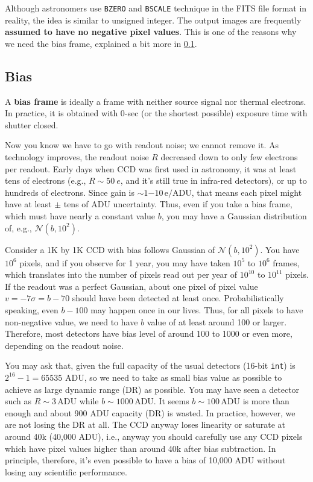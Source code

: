 Although astronomers use \texttt{BZERO} and \texttt{BSCALE} technique in the FITS file format in reality, the idea is similar to unsigned integer. The output images are frequently \textbf{assumed to have no negative pixel values}. This is one of the reasons why we need the bias frame, explained a bit more in \cref{ss: calib-bias}.



\subsection{Bias} \label{ss: calib-bias} 
\begin{defn}[Bias]
A \textbf{bias frame} is ideally a frame with neither source signal nor thermal electrons. In practice, it is obtained with 0-sec (or the shortest possible) exposure time with shutter closed.
\end{defn}

Now you know we have to go with readout noise; we cannot remove it. As technology improves, the readout noise $ R $ decreased down to only few electrons per readout. Early days when CCD was first used in astronomy, it was at least tens of electrons (e.g., $ R \sim \SI{50}{e} $, and it's still true in infra-red detectors), or up to hundreds of electrons. Since gain is $ \sim 1\mathrm{-}10 \,\mathrm{e/ADU} $, that means each pixel might have at least $ \pm $ tens of ADU uncertainty. Thus, even if you take a bias frame, which must have nearly a constant value $ b $, you may have a Gaussian distribution of, e.g., $ \mathcal{N}(b, 10^2) $. 

Consider a 1K by 1K CCD with bias follows Gaussian of $ \mathcal{N}(b, 10^2) $. You have $ 10^6 $ pixels, and if you observe for 1 year, you may have taken $ 10^5 $ to $ 10^6 $ frames, which translates into the number of pixels read out per year of $ 10^{10} $ to $ 10^{11} $ pixels. If the readout was a perfect Gaussian, about one pixel of pixel value $ v = -7 \sigma = b - 70 $ should have been detected at least once. Probabilistically speaking, even $ b - 100 $ may happen once in our lives. Thus, for all pixels to have non-negative value, we need to have $ b $ value of at least around 100 or larger. Therefore, most detectors have bias level of around 100 to 1000 or even more, depending on the readout noise.

You may ask that, given the full capacity of the usual detectors (16-bit \texttt{int}) is $ 2^{16}-1 = 65535 $ ADU, so we need to take as small bias value as possible to achieve as large dynamic range (DR) as possible. You may have seen a detector such as $ R \sim 3 \,\mathrm{ADU} $ while $ b \sim 1000 \,\mathrm{ADU} $. It seems $ b \sim 100\,\mathrm{ADU} $ is more than enough and about 900 ADU capacity (DR) is wasted. In practice, however, we are not losing the DR at all. The CCD anyway loses linearity or saturate at around 40k (40,000 ADU), i.e., anyway you should carefully use any CCD pixels which have pixel values higher than around 40k after bias subtraction. In principle, therefore, it's even possible to have a bias of 10,000 ADU without losing any scientific performance.

